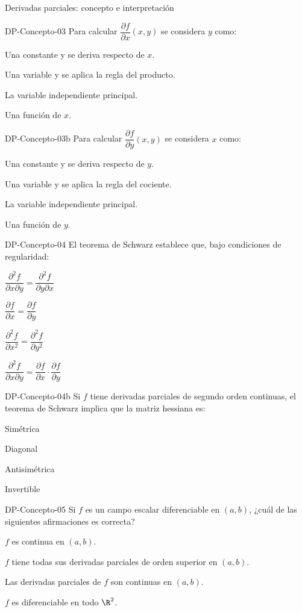 \documentclass[a4,11pt]{aleph-notas}
\begin{document}
\begin{quiz}{Derivadas parciales: concepto e interpretación}
\begin{multi}[]%
    {DP-Concepto-03}
    Para calcular $\dfrac{\partial f}{\partial x}(x,y)$ se considera $y$ como:
    \item* Una constante y se deriva respecto de $x$.
    \item Una variable y se aplica la regla del producto.
    \item La variable independiente principal.
    \item Una función de $x$.
\end{multi}

\begin{multi}[]%
    {DP-Concepto-03b}
    Para calcular $\dfrac{\partial f}{\partial y}(x,y)$ se considera $x$ como:
    \item* Una constante y se deriva respecto de $y$.
    \item Una variable y se aplica la regla del cociente.
    \item La variable independiente principal.
    \item Una función de $y$.
\end{multi}

\begin{multi}[]%
    {DP-Concepto-04}
    El teorema de Schwarz establece que, bajo condiciones de regularidad:
    \item* $\dfrac{\partial^2 f}{\partial x \partial y} = \dfrac{\partial^2 f}{\partial y \partial x}$
    \item $\dfrac{\partial f}{\partial x} = \dfrac{\partial f}{\partial y}$
    \item $\dfrac{\partial^2 f}{\partial x^2} = \dfrac{\partial^2 f}{\partial y^2}$
    \item $\dfrac{\partial^2 f}{\partial x \partial y} = \dfrac{\partial f}{\partial x} \cdot \dfrac{\partial f}{\partial y}$
\end{multi}

\begin{multi}[]%
    {DP-Concepto-04b}
    Si $f$ tiene derivadas parciales de segundo orden continuas, el teorema de Schwarz implica que la matriz hessiana es:
    \item* Simétrica
    \item Diagonal
    \item Antisimétrica
    \item Invertible
\end{multi}

\begin{multi}[]%
    {DP-Concepto-05}
    Si $f$ es un campo escalar diferenciable en $(a,b)$, ¿cuál de las siguientes afirmaciones es correcta?
    \item* $f$ es continua en $(a,b)$.
    \item $f$ tiene todas sus derivadas parciales de orden superior en $(a,b)$.
    \item Las derivadas parciales de $f$ son continuas en $(a,b)$.
    \item $f$ es diferenciable en todo $\R^2$.
\end{multi}


\end{quiz}
\end{document}
